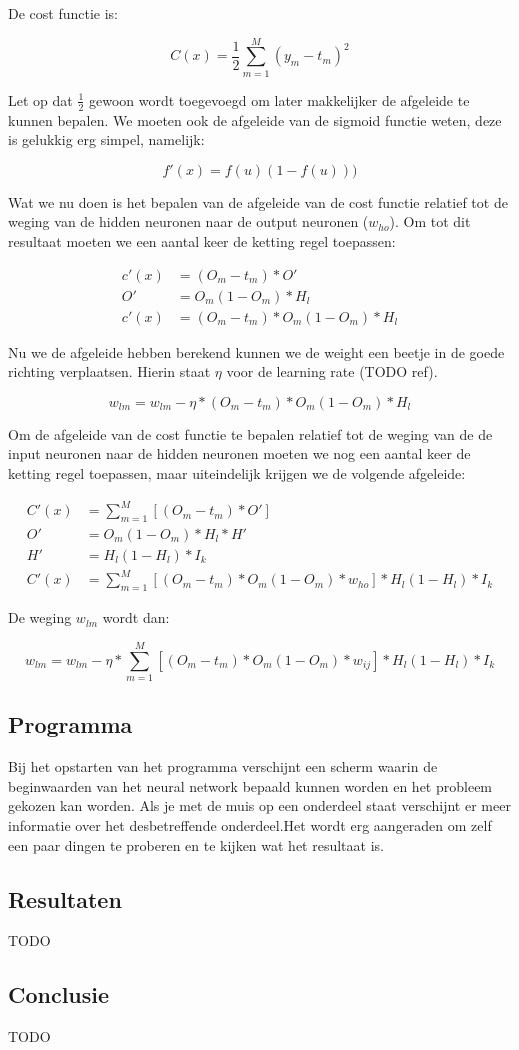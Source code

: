 \documentclass[a4paper,titlepage]{article}
\begin{document}
De cost functie is:

$$ C(x) = \frac{1}{2}\sum_{m=1}^{M}(y_{m}-t_{m})^2 $$

Let op dat $\frac{1}{2}$ gewoon wordt toegevoegd om later makkelijker de afgeleide te kunnen bepalen. We moeten ook de afgeleide van de sigmoid functie weten, deze is gelukkig erg simpel, namelijk:

$$ f'(x) = f(u)(1-f(u))) $$

Wat we nu doen is het bepalen van de afgeleide van de cost functie relatief tot de weging van de hidden neuronen naar de output neuronen ($w_{ho}$). Om tot dit resultaat moeten we een aantal keer de ketting regel toepassen:

\begin{align*}
	c'(x) &= (O_{m}-t_{m}) * O' \\
	O' &= O_{m}(1-O_{m}) * H_{l} \\
	c'(x) &= (O_{m}-t_{m}) * O_{m}(1-O_{m})*H_{l}
\end{align*}

Nu we de afgeleide hebben berekend kunnen we de weight een beetje in de goede richting verplaatsen. Hierin staat $\eta$ voor de learning rate (TODO ref).

$$ w_{lm} = w_{lm} - \eta *(O_{m}-t_{m}) * O_{m}(1-O_{m})*H_{l} $$

Om de afgeleide van de cost functie te bepalen relatief tot de weging van de de input neuronen naar de hidden neuronen moeten we nog een aantal keer de ketting regel toepassen, maar uiteindelijk krijgen we de volgende afgeleide:

\begin{align*}
	C'(x) &= \sum_{m=1}^{M}[(O_{m}-t_{m}) * O'] \\
	O' &= O_{m}(1-O_{m}) * H_{l} * H' \\
	H' &= H_{l}(1-H_{l})*I_{k}\\
	C'(x) &= \sum_{m=1}^{M}[(O_{m}-t_{m}) * O_{m}(1-O_{m})*w_{ho}]*H_{l}(1-H_{l})*I_{k}
\end{align*}



De weging $w_{lm}$ wordt dan:

$$ w_{lm} = w_{lm} - \eta *\sum_{m=1}^{M}[(O_{m}-t_{m}) * O_{m}(1-O_{m})*w_{ij}]*H_{l}(1-H_{l})*I_{k} $$

\subsection{Programma}
Bij het opstarten van het programma verschijnt een scherm waarin de beginwaarden van het neural network bepaald kunnen worden en het probleem gekozen kan worden. Als je met de muis op een onderdeel staat verschijnt er meer informatie over het desbetreffende onderdeel.Het wordt erg aangeraden om zelf een paar dingen te proberen en te kijken wat het resultaat is.


\subsection{Resultaten}
TODO

\subsection{Conclusie}
TODO
\end{document}
